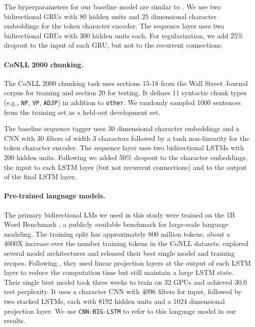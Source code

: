 \documentclass[11pt,a4paper]{article}
\begin{document}
The hyperparameters for our baseline model are similar to \citet{yang-transfer-iclr07}.
We use two bidirectional GRUs with 80 hidden units and 25 dimensional character embeddings for the token character
encoder.  The sequence layer uses two bidirectional GRUs with 300 hidden units each.  For regularization, we add
25\% dropout to the input of each GRU, but not to the recurrent connections.

\paragraph{CoNLL 2000 chunking.}
The CoNLL 2000 chunking task uses sections 15-18 from the Wall Street Journal corpus for training and
section 20 for testing.  It defines 11 syntactic chunk types (e.g., \texttt{NP}, \texttt{VP}, \texttt{ADJP})
in addition to \texttt{other}.  
We randomly sampled 1000 sentences from the training
set as a held-out development set.

The baseline sequence tagger uses 30 dimensional character embeddings and a CNN with 30 filters of width 3 characters followed
by a tanh non-linearity for the token character encoder.
The sequence layer uses two bidirectional LSTMs with 200 hidden units.  Following \citet{Ma2016EndtoendSL} we
added 50\% dropout to the character embeddings, the input to each LSTM layer (but not recurrent connections)
and to the output of the final LSTM layer.

\paragraph{Pre-trained language models.}
\label{sec:language_models}

The primary bidirectional LMs we used in this study were trained
on the 1B Word Benchmark \cite{Chelba2014OneBW}, a publicly available benchmark for large-scale language modeling.
The training split has approximately 800 million tokens, about a 4000X increase over the number training tokens in the CoNLL datasets.  
\citet{Jzefowicz2016ExploringTL} explored several model architectures and released their best single model and training recipes.
Following \citet{Sak2014LongSM}, they used linear projection layers at the output of each LSTM layer to reduce the computation time but still maintain a large LSTM state.
Their single best model took three weeks to train on 32 GPUs and achieved 30.0 test perplexity.  It uses a character CNN with 4096 filters for input, followed by two stacked LSTMs, each with 8192 hidden units and a 1024 dimensional projection layer.
We use \texttt{CNN-BIG-LSTM} to refer to this language model in our results.
\end{document}
